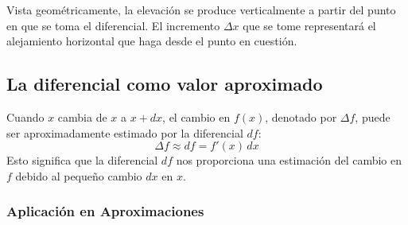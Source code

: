 Vista geométricamente, la elevación se produce verticalmente a partir del punto en que se toma el diferencial. El incremento $\Delta x$ que se tome representará el alejamiento horizontal que haga desde el punto en cuestión.
\begin{center}
    \end{center}




\newpage
\subsection{La diferencial como valor aproximado}

Cuando \( x \) cambia de \( x \) a \( x + dx \), el cambio en \( f(x) \), denotado por \( \Delta f \), puede ser aproximadamente estimado por la diferencial \( df \):
\begin{equation}
    \Delta f \approx df = f'(x) \, dx
\end{equation}
Esto significa que la diferencial \( df \) nos proporciona una estimación del cambio en \( f \) debido al pequeño cambio \( dx \) en \( x \).

\subsubsection{Aplicación en Aproximaciones}

